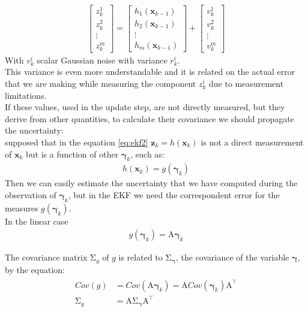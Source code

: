 \begin{align}
{\begin{bmatrix}
z_k^1 \\[10pt]
z_k^2 \\[10pt]
\vdots \\[10pt]
z_k^m
\end{bmatrix}}=
{\begin{bmatrix}
 h_1(\boldsymbol{x}_{k-1}) \\[10pt]
h_2(\boldsymbol{x}_{k-1})  \\[10pt]
\vdots \\[10pt]
h_m(\boldsymbol{x}_{k-1}) 
\end{bmatrix}} 
+ 
{\begin{bmatrix}
v_k^1 \\[10pt]
v_k^2 \\[10pt]
\vdots \\[10pt]
v_k^m
\end{bmatrix}}
\end{align}
With $v_k^i$ scalar Gaussian noise with variance $r_k^i$.\\
This variance is even more understandable and it is related on the actual error that we are making while measuring the component $z_k^i$ due to measurement limitations.\\
If these values, used in the update step, are not directly measured, but they derive from other quantities, to calculate their covariance we should propagate the uncertainty:\\
supposed that in the equation \ref{eq:ekf2} $\boldsymbol{z}_k = h(\boldsymbol{x}_{k})$ is not a direct measurement of $\boldsymbol{x}_{k}$ but is a function of other  $\boldsymbol{\gamma}_k$, such as:
\begin{align}
h(\boldsymbol{x}_{k}) = g(\boldsymbol{\gamma}_k)
\end{align}
Then we can easily estimate the uncertainty that we have computed during the observation of  $\boldsymbol{\gamma}_k$, but in the EKF we need the correspondent error for the measures $ g(\boldsymbol{\gamma}_k)$.\\

In the linear case 
\begin{align}
g(\boldsymbol{\gamma}_k) = \mathrm {A}\boldsymbol{\gamma}_k
\end{align}

The covariance matrix $\mathrm {\Sigma }_g$ of $g$ is related to $\mathrm {\Sigma }_{\boldsymbol{\gamma}}$, the covariance of the variable $\boldsymbol{\gamma}$, by the equation:
\begin{align}
\begin{split}
Cov(g) &= Cov(\mathrm {A}\boldsymbol{\gamma}_k) = \mathrm {A}Cov(\boldsymbol{\gamma}_k)\mathrm {A} ^{\top} \\
\mathrm {\Sigma }_g &=\mathrm {A} \mathrm {\Sigma }_{\boldsymbol{\gamma}}\mathrm {A} ^{\top}
\end{split}
\end{align}


